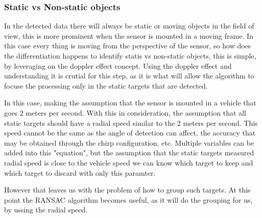 \subsubsection{Static vs Non-static objects}
In the detected data there will always be static or moving objects in the field of view, this is more prominent when the sensor is mounted in a moving frame.
In this case every thing is moving from the perspective of the sensor, so how does the differentiation happens to identify statis vs non-static objects, this is simple, by leveraging on the doppler effect concept.
Using the doppler effect and understanding it is crutial for this step, as it is what will allow the algorithm to focuse the processing only in the static targets that are detected.

In this case, making the assumption that the sensor is mounted in a vehicle that goes 2 meters per second. With this in consideration, the assumption that all static targets should have a radial speed similar to the 2 meters per second.
This speed cannot be the same as the angle of detection can affect, the accuracy that may be obtained through the chirp configuration, etc.
Multiple variables can be added into this "equation", but the assumption that the static targets measured radial speed is close to the vehicle speed we can know which target to keep and which target to discard with only this paramter.

However that leaves us with the problem of how to group such targets. At this point the RANSAC algorithm becomes useful, as it will do the grouping for us, by ussing the radial speed.
